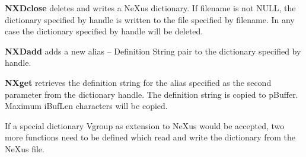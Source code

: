\documentclass[12pt]{article}
\begin{document}
  {\bf NXDclose} deletes and writes a NeXus dictionary. If filename is not NULL,
  the dictionary specified by handle is written to the file specified by
  filename. In any case the dictionary specified by handle will be deleted.

  {\bf NXDadd} adds a new alias -- Definition String pair to the dictionary
  specified by handle.

  {\bf NXget} retrieves the definition string for the alias specified as
  the second parameter from the dictionary handle. The definition string
  is copied to pBuffer. Maximum iBufLen characters will be copied.
  
  If a special dictionary Vgroup as extension to NeXus would be accepted,
  two more functions need to be defined which read and write the dictionary 
  from the NeXus file.
\end{document}
